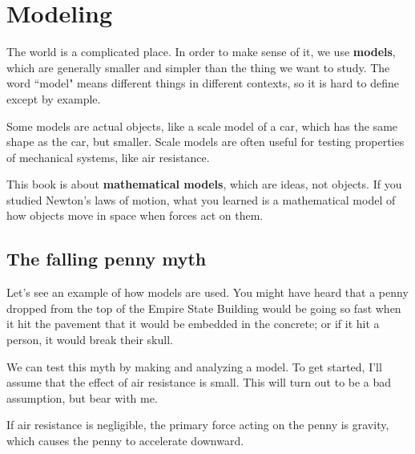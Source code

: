 \documentclass[12pt]{book}
\theoremstyle{exercise}
\begin{document}
\normalsize

\cleardoublepage

\begin{latexonly}


\cleardoublepage

\end{latexonly}

\mainmatter


\chapter{Modeling}
\label{chap01}

The world is a complicated place.  In order to make sense of it, we use {\bf models}, which are generally smaller and simpler than the thing we want to study.  The word ``model" means different things in different contexts, so it is hard to define except by example.

Some models are actual objects, like a scale model of a car, which has the same shape as the car, but smaller.  Scale models are often useful for testing properties of mechanical systems, like air resistance.

This book is about {\bf mathematical models}, which are ideas, not objects.  If you studied Newton's laws of motion, what you learned is a mathematical model of how objects move in space when forces act on them.


\section{The falling penny myth}
\label{penny}

Let's see an example of how models are used.  You might have heard that a penny dropped from the top of the Empire State Building would be going so fast when it hit the pavement that it would be embedded in the concrete; or if it hit a person, it would break their skull.

We can test this myth by making and analyzing a model.  To get started, I'll assume that the effect of air resistance is small.  This will turn out to be a bad assumption, but bear with me.

If air resistance is negligible, the primary force acting on the penny is gravity, which causes the penny to accelerate downward.
\end{document}
